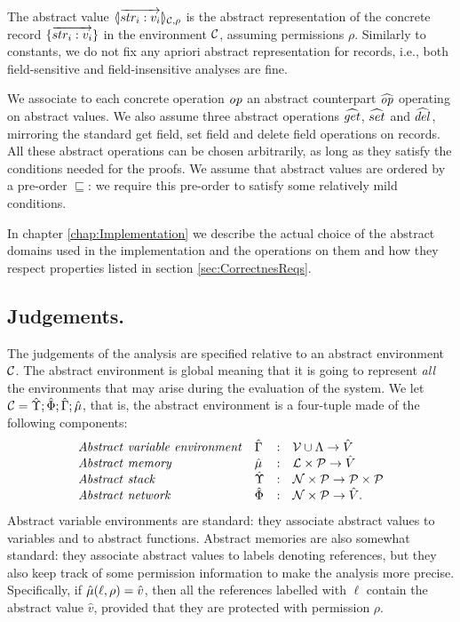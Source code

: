 The abstract value $\langle\!| \overrightarrow{str_i: v_i} |\!\rangle_{{\cal C},\rho}$ is the abstract representation
of the concrete record $\{\overrightarrow{str_i: v_i}\}$ in the environment ${\cal C}$, assuming
permissions $\rho$. Similarly to constants, we do not fix any apriori abstract representation
for records, i.e., both field-sensitive and field-insensitive analyses are fine.

We associate to each concrete operation $\mathit{op}$ an abstract counterpart $\widehat{\mathit{op}}$
operating on abstract values. We also assume three abstract operations $\widehat{get}$,
$\widehat{set}$ and $\widehat{del}$, mirroring the standard get field, set field and delete
field operations on records. All these abstract operations can be chosen arbitrarily,
as long as they satisfy the conditions needed for the proofs. We assume that abstract
values are ordered by a pre-order $\sqsubseteq$: we require this pre-order to satisfy
some relatively mild conditions.

In chapter \ref{chap:Implementation} we describe the actual choice of the abstract domains used in the implementation and the operations on them and how they respect properties listed in section \ref{sec:CorrectnesReqs}.

\subsection{Judgements.}  The judgements of the analysis are specified
relative to an abstract environment ${\cal C}$. The abstract environment
is global meaning that it is going to represent \emph{all} the
environments that may arise during the evaluation of the system.
We let ${\cal C}=\hat{\Upsilon} ; \hat{\Phi} ; \hat{\Gamma} ; \hat{\mu}$, that is, the 
abstract environment is a four-tuple made of the following components:
\[
\begin{array}{llcl}
\mathit{Abstract\ variable\ environment} & \hat{\Gamma} & : & \mathcal{V} \cup \Lambda \rightarrow \hat{V} \\
\mathit{Abstract\ memory} & \hat{\mu} & : & {\mathcal L} \times \mathcal{P} \rightarrow \hat{V} \\
\mathit{Abstract\ stack} & \hat{\Upsilon} & : & \mathcal{N} \times \mathcal{P} \rightarrow \mathcal{P} \times \mathcal{P} \\
\mathit{Abstract\ network} & \hat{\Phi} & : & \mathcal{N} \times \mathcal{P} \rightarrow \hat{V}.
\end{array}
\]
Abstract variable environments are standard: they associate abstract values to
variables and to abstract functions. 
Abstract memories are also somewhat standard: they associate abstract
values to labels denoting references, but they also keep track of some permission
information to make the analysis more precise. Specifically, 
if $\hat{\mu}(\ell,\rho) = \hat{v}$, then all the references
labelled with $\ell$ contain the abstract value $\hat{v}$, provided that they
are protected with permission $\rho$.

